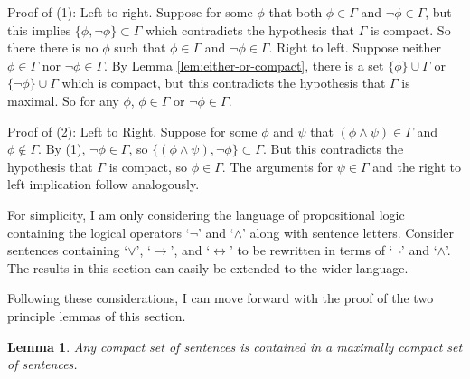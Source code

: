\documentclass[12pt]{article}
\newtheorem{lemma}[theorem]{Lemma}
\theoremstyle{definition}
\theoremstyle{remark}
\begin{document}
Proof of (1): Left to right. Suppose for some $\phi$ that both $\phi \in \Gamma$ and $\neg\phi \in \Gamma$, but this implies $\{ \phi, \neg\phi \} \subset \Gamma$ which contradicts the hypothesis that $\Gamma$ is compact. So there there is no $\phi$ such that $\phi \in \Gamma$ and $\neg\phi \in \Gamma$. Right to left. Suppose neither $\phi \in \Gamma$ nor $\neg\phi \in \Gamma$. By Lemma \ref{lem:either-or-compact}, there is a set $\{ \phi \} \cup \Gamma$ or $\{ \neg\phi \} \cup \Gamma$ which is compact, but this contradicts the hypothesis that $\Gamma$ is maximal. So for any $\phi$, $\phi \in \Gamma$ or $\neg\phi \in \Gamma$.

Proof of (2): Left to Right. Suppose for some $\phi$ and $\psi$ that $(\phi \land \psi) \in \Gamma$ and $\phi \not\in \Gamma$. By (1), $\neg\phi \in \Gamma$, so $\{ (\phi \land \psi), \neg\phi \} \subset \Gamma$. But this contradicts the hypothesis that $\Gamma$ is compact, so $\phi \in \Gamma$. The arguments for $\psi \in \Gamma$ and the right to left implication follow analogously.

For simplicity, I am only considering the language of propositional logic containing the logical operators `$\neg$' and `$\land$' along with sentence letters. Consider sentences containing `$\lor$', `$\rightarrow$', and `$\leftrightarrow$' to be rewritten in terms of `$\neg$' and `$\land$'. The results in this section can easily be extended to the wider language. 

Following these considerations, I can move forward with the proof of the two principle lemmas of this section.

\begin{lemma}
	\label{lem:prop-maximal}
	Any compact set of sentences is contained in a maximally compact set of sentences.
\end{lemma}
\end{document}
